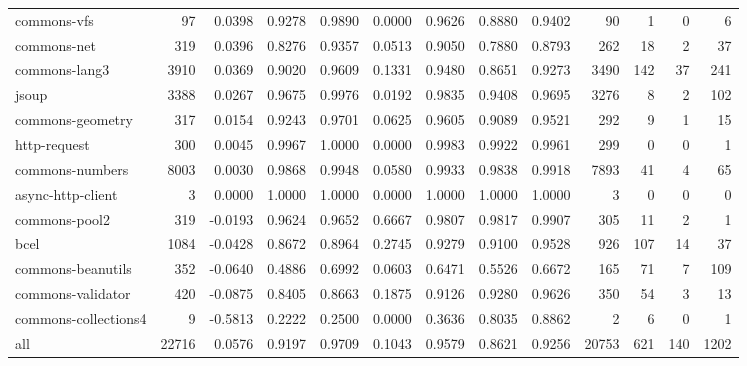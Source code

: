 \begin{table}
\begin{tabular}{lrrrrrrrrrrrr}
            commons-vfs &     97 &      0.0398 &  0.9278 &     0.9890 &     0.0000 &  0.9626 &     0.8880 &   0.9402 &     90 &    1 &    0 &     6 \\
            commons-net &    319 &      0.0396 &  0.8276 &     0.9357 &     0.0513 &  0.9050 &     0.7880 &   0.8793 &    262 &   18 &    2 &    37 \\
          commons-lang3 &   3910 &      0.0369 &  0.9020 &     0.9609 &     0.1331 &  0.9480 &     0.8651 &   0.9273 &   3490 &  142 &   37 &   241 \\
                  jsoup &   3388 &      0.0267 &  0.9675 &     0.9976 &     0.0192 &  0.9835 &     0.9408 &   0.9695 &   3276 &    8 &    2 &   102 \\
       commons-geometry &    317 &      0.0154 &  0.9243 &     0.9701 &     0.0625 &  0.9605 &     0.9089 &   0.9521 &    292 &    9 &    1 &    15 \\
           http-request &    300 &      0.0045 &  0.9967 &     1.0000 &     0.0000 &  0.9983 &     0.9922 &   0.9961 &    299 &    0 &    0 &     1 \\
        commons-numbers &   8003 &      0.0030 &  0.9868 &     0.9948 &     0.0580 &  0.9933 &     0.9838 &   0.9918 &   7893 &   41 &    4 &    65 \\
      async-http-client &      3 &      0.0000 &  1.0000 &     1.0000 &     0.0000 &  1.0000 &     1.0000 &   1.0000 &      3 &    0 &    0 &     0 \\
          commons-pool2 &    319 &     -0.0193 &  0.9624 &     0.9652 &     0.6667 &  0.9807 &     0.9817 &   0.9907 &    305 &   11 &    2 &     1 \\
                   bcel &   1084 &     -0.0428 &  0.8672 &     0.8964 &     0.2745 &  0.9279 &     0.9100 &   0.9528 &    926 &  107 &   14 &    37 \\
      commons-beanutils &    352 &     -0.0640 &  0.4886 &     0.6992 &     0.0603 &  0.6471 &     0.5526 &   0.6672 &    165 &   71 &    7 &   109 \\
      commons-validator &    420 &     -0.0875 &  0.8405 &     0.8663 &     0.1875 &  0.9126 &     0.9280 &   0.9626 &    350 &   54 &    3 &    13 \\
   commons-collections4 &      9 &     -0.5813 &  0.2222 &     0.2500 &     0.0000 &  0.3636 &     0.8035 &   0.8862 &      2 &    6 &    0 &     1 \\
                    all &  22716 &      0.0576 &  0.9197 &     0.9709 &     0.1043 &  0.9579 &     0.8621 &   0.9256 &  20753 &  621 &  140 &  1202 \\
\bottomrule
\end{tabular}
\end{table}
